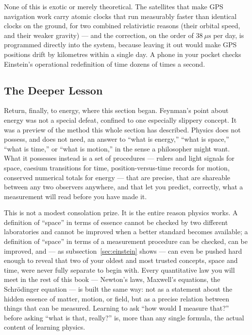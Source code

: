 None of this is exotic or merely theoretical. The satellites that make GPS navigation work carry atomic clocks that run measurably faster than identical clocks on the ground, for two combined relativistic reasons (their orbital speed, and their weaker gravity) --- and the correction, on the order of $38\ \mu\text{s}$ per day, is programmed directly into the system, because leaving it out would make GPS positions drift by kilometres within a single day. A phone in your pocket checks Einstein's operational redefinition of time dozens of times a second.

\subsection{The Deeper Lesson}
\label{sec:lesson}

Return, finally, to energy, where this section began. Feynman's point about energy was not a special defeat, confined to one especially slippery concept. It was a preview of the method this whole section has described. Physics does not possess, and does not need, an answer to ``what is energy,'' ``what is space,'' ``what is time,'' or ``what is motion,'' in the sense a philosopher might want. What it possesses instead is a set of procedures --- rulers and light signals for space, caesium transitions for time, position-versus-time records for motion, conserved numerical totals for energy --- that are precise, that are shareable between any two observers anywhere, and that let you predict, correctly, what a measurement will read before you have made it.

This is not a modest consolation prize. It is the entire reason physics works. A definition of ``space'' in terms of essence cannot be checked by two different laboratories and cannot be improved when a better standard becomes available; a definition of ``space'' in terms of a measurement procedure can be checked, can be improved, and --- as subsection~\ref{sec:einstein} shows --- can even be pushed hard enough to reveal that two of your oldest and most trusted concepts, space and time, were never fully separate to begin with. Every quantitative law you will meet in the rest of this book --- Newton's laws, Maxwell's equations, the Schr\"odinger equation --- is built the same way: not as a statement about the hidden essence of matter, motion, or field, but as a precise relation between things that can be measured. Learning to ask ``how would I measure that?'' before asking ``what is that, really?'' is, more than any single formula, the actual content of learning physics.

